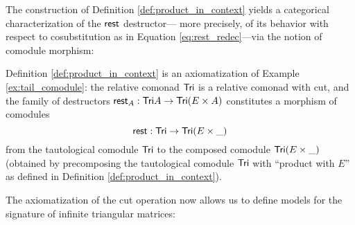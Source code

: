 \documentclass[a4paper,USenglish]{lipics}
\begin{document}
\noindent
The construction of Definition \ref{def:product_in_context} yields a categorical characterization of the $\mathsf{rest}$ destructor---%
more precisely, of its behavior with respect to cosubstitution as in Equation \ref{eq:rest_redec}---via the notion of comodule morphism:


\begin{example}\label{ex:tail_comodule_alternative}
Definition \ref{def:product_in_context} is an axiomatization of Example \ref{ex:tail_comodule}:
the relative comonad $\mathsf{Tri}$ is a relative comonad with cut, and 
the family of destructors $\mathsf{rest}_A : \mathsf{Tri} A \to \mathsf{Tri} (E\times A)$ constitutes a morphism of comodules
\[ \mathsf{rest} : \mathsf{Tri} \to \mathsf{Tri} (E \times \_ ) \]
from the tautological comodule $\mathsf{Tri}$ to the composed comodule $\mathsf{Tri} (E\times \_)$ (obtained by precomposing the tautological comodule $\mathsf{Tri}$
with \enquote{product with $E$} as defined in Definition \ref{def:product_in_context}).
  
\end{example}


The axiomatization of the cut operation now allows us to define models for the signature of infinite triangular matrices:
\end{document}
